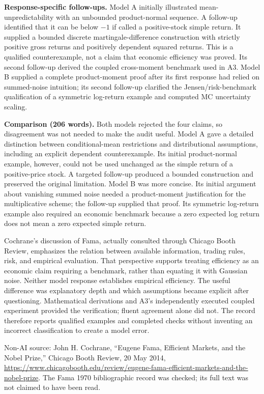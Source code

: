 \textbf{Response-specific follow-ups.} Model A initially illustrated mean-unpredictability with an unbounded product-normal sequence. A follow-up identified that it can be below $-1$ if called a positive-stock simple return. It supplied a bounded discrete martingale-difference construction with strictly positive gross returns and positively dependent squared returns. This is a qualified counterexample, not a claim that economic efficiency was proved. Its second follow-up derived the coupled cross-moment benchmark used in A3. Model B supplied a complete product-moment proof after its first response had relied on summed-noise intuition; its second follow-up clarified the Jensen/risk-benchmark qualification of a symmetric log-return example and computed MC uncertainty scaling.

\textbf{Comparison (206 words).} Both models rejected the four claims, so disagreement was not needed to make the audit useful. Model A gave a detailed distinction between conditional-mean restrictions and distributional assumptions, including an explicit dependent counterexample. Its initial product-normal example, however, could not be used unchanged as the simple return of a positive-price stock. A targeted follow-up produced a bounded construction and preserved the original limitation. Model B was more concise. Its initial argument about vanishing summed noise needed a product-moment justification for the multiplicative scheme; the follow-up supplied that proof. Its symmetric log-return example also required an economic benchmark because a zero expected log return does not mean a zero expected simple return.

Cochrane's discussion of Fama, actually consulted through Chicago Booth Review, emphasizes the relation between available information, trading rules, risk, and empirical evaluation. That perspective supports treating efficiency as an economic claim requiring a benchmark, rather than equating it with Gaussian noise. Neither model response establishes empirical efficiency. The useful difference was explanatory depth and which assumptions became explicit after questioning. Mathematical derivations and A3's independently executed coupled experiment provided the verification; fluent agreement alone did not. The record therefore reports qualified examples and completed checks without inventing an incorrect classification to create a model error.

Non-AI source: John H. Cochrane, ``Eugene Fama, Efficient Markets, and the Nobel Prize,'' Chicago Booth Review, 20 May 2014, \url{https://www.chicagobooth.edu/review/eugene-fama-efficient-markets-and-the-nobel-prize}. The Fama 1970 bibliographic record was checked; its full text was not claimed to have been read.
